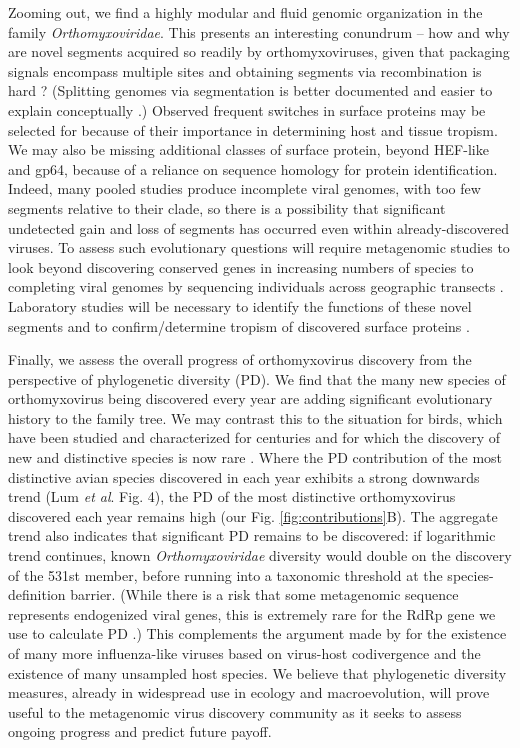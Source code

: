 \documentclass[11pt,twocolumn]{article}
\begin{document}
Zooming out, we find a highly modular and fluid genomic organization in the family \textit{Orthomyxoviridae}. This presents an interesting conundrum -- how and why are novel segments acquired so readily by orthomyxoviruses, given that packaging signals encompass multiple sites \citep{baker_influenza_2014} and obtaining segments via recombination is hard \citep{chare_phylogenetic_2003}? (Splitting genomes via segmentation is better documented \citep{kondo_orchid_2006,qin_tick-borne_2014} and easier to explain conceptually \citep{ke_phylodynamic_2013}.) Observed frequent switches in surface proteins may be selected for because of their importance in determining host and tissue tropism. We may also be missing additional classes of surface protein, beyond HEF-like and gp64, because of a reliance on sequence homology for protein identification. Indeed, many pooled studies produce incomplete viral genomes, with too few segments relative to their clade, so there is a possibility that significant undetected gain and loss of segments has occurred even within already-discovered viruses. To assess such evolutionary questions will require metagenomic studies to look beyond discovering conserved genes in increasing numbers of species to completing viral genomes by sequencing individuals across geographic transects \citep{batson_single_2021}. Laboratory studies will be necessary to identify the functions of these novel segments and to confirm/determine tropism of discovered surface proteins \citep{arunkumar_functionality_2021}.


Finally, we assess the overall progress of orthomyxovirus discovery from the perspective of phylogenetic diversity (PD). We find that the many new species of orthomyxovirus being discovered every year are adding significant evolutionary history to the family tree. We may contrast this to the situation for birds, which have been studied and characterized for centuries and for which the discovery of new and distinctive species is now rare \citep{lum_tracking_2022}. Where the PD contribution of the most distinctive avian species discovered in each year exhibits a strong downwards trend (Lum \textit{et al}.\citep{lum_tracking_2022} Fig. 4), the PD of the most distinctive orthomyxovirus discovered each year remains high (our Fig. \ref{fig:contributions}B). The aggregate trend also indicates that significant PD remains to be discovered: if logarithmic trend continues, known \textit{Orthomyxoviridae} diversity would double on the discovery of the 531st member, before running into a taxonomic threshold at the species-definition barrier. (While there is a risk that some metagenomic sequence represents endogenized viral genes, this is extremely rare for the RdRp gene we use to calculate PD \citep{whitfield_diversity_2017}.)
This complements the argument made by \cite{parry_divergent_2020} for the existence of many more influenza-like viruses based on virus-host codivergence and the existence of many unsampled host species.
We believe that phylogenetic diversity measures, already in widespread use in ecology and macroevolution, will prove useful to the metagenomic virus discovery community as it seeks to assess ongoing progress and predict future payoff.
\end{document}
